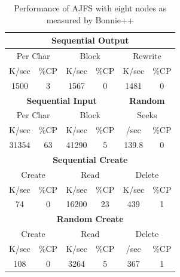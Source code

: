 \begin{table}[Ht]
\centering
\begin{tabular}{| c | c | c | c | c | c |}
\hline
\multicolumn{6}{|c|}{\bf Sequential Output}\\
\hline
\multicolumn{2}{|c|}{Per Char} &
\multicolumn{2}{c|}{Block} &
\multicolumn{2}{c|}{Rewrite} \\
\hline
K/sec & \%CP & K/sec & \%CP & K/sec & \%CP \\
\hline
 1500 & 3 & 1567 & 0 & 1481 & 0 \\
\hline

\multicolumn{4}{|c|}{\bf Sequential Input} & \multicolumn{2}{c|}{\bf Random}\\
\hline
\multicolumn{2}{|c|}{Per Char} &
\multicolumn{2}{c|}{Block} &
\multicolumn{2}{c|}{Seeks} \\
\hline
K/sec & \%CP & K/sec & \%CP & /sec & \%CP \\
\hline
 31354 & 63 & 41290 & 5 & 139.8 & 0 \\
\hline

\multicolumn{6}{|c|}{\bf Sequential Create}\\
\hline
\multicolumn{2}{|c|}{Create} &
\multicolumn{2}{c|}{Read} &
\multicolumn{2}{c|}{Delete} \\
\hline
K/sec & \%CP & K/sec & \%CP & K/sec & \%CP \\
\hline
   74 & 0 & 16200 & 23 & 439 & 1 \\
\hline

\multicolumn{6}{|c|}{\bf Random Create}\\
\hline
\multicolumn{2}{|c|}{Create} &
\multicolumn{2}{c|}{Read} &
\multicolumn{2}{c|}{Delete} \\
\hline
K/sec & \%CP & K/sec & \%CP & /sec & \%CP \\
\hline
  108 & 0 & 3264 & 5 & 367 & 1 \\
\hline
\end{tabular}
\caption{Performance of AJFS with eight nodes as measured by Bonnie++}
\label{tab:bonnie-8n}
\end{table}








